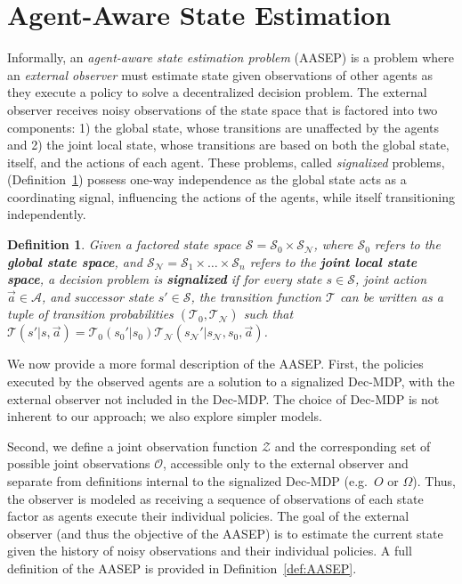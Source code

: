 \documentclass[letterpaper,10pt,conference]{ieeeconf}
\newtheorem{definition}{Definition}
\begin{document}
\section{Agent-Aware State Estimation}

Informally, an \emph{agent-aware state estimation problem} (AASEP) is a problem where an \emph{external observer} must estimate state given observations of other agents as they execute a policy to solve a decentralized decision problem. The external observer receives noisy observations of the state space that is factored into two components: 1) the global state, whose transitions are unaffected by the agents and 2) the joint local state, whose transitions are based on both the global state, itself, and the actions of each agent. These problems, called \emph{signalized} problems, (Definition~\ref{def:signalized}) possess one-way independence as the global state acts as a coordinating signal, influencing the actions of the agents, while itself transitioning independently.

\begin{definition}
   Given a factored state space $\mathcal{S} = \mathcal{S}_0 \times \mathcal{S_N}$, where $\mathcal{S}_0$ refers to the \textbf{global state space}, and $\mathcal{S_N} = \mathcal{S}_1 \times \dots \times \mathcal{S}_n$ refers to the \textbf{joint local state space}, a decision problem is \textbf{signalized} if for every state $s \in \mathcal{S}$, joint action $\vec{a} \in \mathcal{A}$, and successor state $s' \in \mathcal{S}$, the transition function $\mathcal{T}$ can be written as a tuple of transition probabilities $(\mathcal{T}_0, \mathcal{T_N})$ such that $\mathcal{T}(s'|s,\vec{a}) = \mathcal{T}_0(s_0'|s_0)\mathcal{T_N}(s_\mathcal{N}'|s_\mathcal{N}, s_0, \vec{a})$.
   \label{def:signalized}
\end{definition}

We now provide a more formal description of the AASEP. 
First, the policies executed by the observed agents are a solution to a signalized Dec-MDP, with the external observer not included in the Dec-MDP. The choice of Dec-MDP is not inherent to our approach; we also explore simpler models.

Second, we define a joint observation function $\mathcal{Z}$ and the corresponding set of possible joint observations $\mathcal{O}$, accessible only to the external observer and separate from definitions internal to the signalized Dec-MDP (e.g.\ $O$ or $\Omega$). Thus, the observer is modeled as receiving a sequence of observations of each state factor as agents execute their individual policies. The goal of the external observer (and thus the objective of the AASEP) is to estimate the current state given the history of noisy observations and their individual policies. A full definition of the AASEP is provided in Definition~\ref{def:AASEP}.
\end{document}
